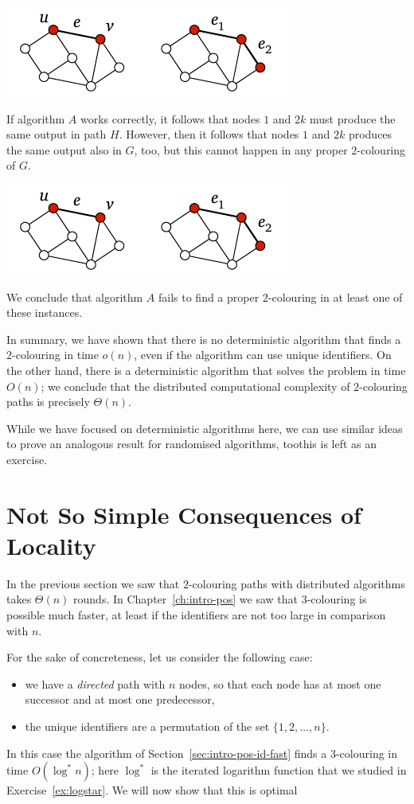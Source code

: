 \begin{center}
    \includegraphics[page=\PIntroLbTwoD]{figs.pdf}
\end{center}
If algorithm $A$ works correctly, it follows that nodes $1$ and $2k$ must produce the same output in path $H$. However, then it follows that nodes $1$ and $2k$ produces the same output also in $G$, too, but this cannot happen in any proper $2$-colouring of $G$.
\begin{center}
    \includegraphics[page=\PIntroLbTwoE]{figs.pdf}
\end{center}
We conclude that algorithm $A$ fails to find a proper $2$-colouring in at least one of these instances.

In summary, we have shown that there is no deterministic algorithm that finds a $2$-colouring in time $o(n)$, even if the algorithm can use unique identifiers. On the other hand, there is a deterministic algorithm that solves the problem in time $O(n)$; we conclude that the distributed computational complexity of $2$-colouring paths is precisely $\Theta(n)$.

While we have focused on deterministic algorithms here, we can use similar ideas to prove an analogous result for randomised algorithms, too\mydash this is left as an exercise.


\section{Not So Simple Consequences of Locality}\label{sec:intro-neg-logstar}

In the previous section we saw that $2$-colouring paths with distributed algorithms takes $\Theta(n)$ rounds. In Chapter~\ref{ch:intro-pos} we saw that $3$-colouring is possible much faster, at least if the identifiers are not too large in comparison with $n$.

For the sake of concreteness, let us consider the following case:
\begin{itemize}
    \item we have a \emph{directed} path with $n$ nodes, so that each node has at most one successor and at most one predecessor,
    \item the unique identifiers are a permutation of the set $\{1,2,\dotsc,n\}$.
\end{itemize}
In this case the algorithm of Section~\ref{sec:intro-pos-id-fast} finds a $3$-colouring in time $O(\log^* n)$; here $\log^*$ is the iterated logarithm function that we studied in Exercise~\ref{ex:logstar}. We will now show that this is optimal

